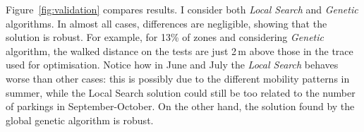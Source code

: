 Figure~\ref{fig:validation} compares results. I consider both \textit{Local Search} and \textit{Genetic} algorithms.
In almost all cases, differences are negligible, showing that the solution is robust. For example, for 13\% of zones and considering \textit{Genetic} algorithm, the walked distance on the tests are just 2\,m above those in the trace used for optimisation. Notice how in June and July the \textit{Local Search} behaves worse than other cases: this is possibly due to the different mobility patterns in summer, while the Local Search solution could still be too related to the number of parkings in September-October. On the other hand, the solution found by the global genetic algorithm is robust.
